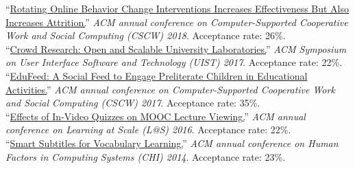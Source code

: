 
``\href{https://hci.stanford.edu/publications/2018/habitlab/habitlab-cscw18.pdf}{Rotating Online Behavior Change Interventions Increases Effectiveness But Also Increases Attrition.}'' \emph{ACM annual conference on Computer-Supported Cooperative Work and Social Computing (CSCW) 2018}. Acceptance rate: 26\%.\\

``\href{https://hci.stanford.edu/publications/2017/crowdresearch/crowd-research-uist2017.pdf}{Crowd Research: Open and Scalable University Laboratories.}'' \emph{ACM Symposium on User Interface Software and Technology (UIST) 2017}. Acceptance rate: 22\%.\\

``\href{https://www.microsoft.com/en-us/research/wp-content/uploads/2016/10/edufeed.pdf}{EduFeed: A Social Feed to Engage Preliterate Children in Educational Activities.}'' \emph{ACM annual conference on Computer-Supported Cooperative Work and Social Computing (CSCW) 2017}. Acceptance rate: 35\%.\\

``\href{https://hci.stanford.edu/publications/2016/invideo/invideo-las2016.pdf}{Effects of In-Video Quizzes on MOOC Lecture Viewing.}'' \emph{ACM annual conference on Learning at Scale (L@S) 2016}. Acceptance rate: 22\%.\\

``\href{http://up.csail.mit.edu/other-pubs/chi2014-smartsubs.pdf}{Smart Subtitles for Vocabulary Learning.}'' \emph{ACM annual conference on Human Factors in Computing Systems (CHI) 2014}. Acceptance rate: 23\%.\\



